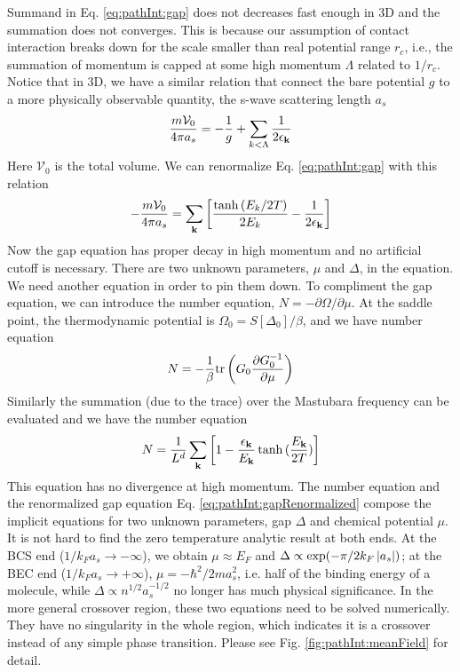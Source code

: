 Summand in Eq. \ref{eq:pathInt:gap} does not decreases fast enough in 3D and the summation does not converges.  This is because our assumption of contact interaction breaks down for the scale smaller than real potential range $r_{c}$, i.e., the summation of momentum is capped at some high momentum $\Lambda$ related to $1/r_{c}$.  Notice that in 3D, we have a similar relation that connect the bare potential $g$ to a more physically observable quantity, the s-wave scattering length $a_{s}$
\begin{equation}\label{eq:pathInt:as}
\frac{m\mathcal{V}_{0}}{4\pi{}a_{s}}=-\frac{1}{g}+\sum_{k<\Lambda}\frac{1}{2\epsilon_{\mathbf{k}}}
\end{equation}
Here $\mathcal{V}_{0}$ is the total volume.  We can renormalize Eq. \ref{eq:pathInt:gap} with this relation
\begin{equation}\label{eq:pathInt:gapRenormalized}
-\frac{m\mathcal{V}_{0}}{4\pi{}a_{s}}=\sum_{\mathbf{k}}\left[\frac{\tanh{(E_k/2T)}}{2E_k}-\frac{1}{2\epsilon_{\mathbf{k}}}\right]
\end{equation}
Now the gap equation has proper decay in high momentum and no artificial cutoff is necessary.  There are two unknown parameters, $\mu$ and $\Delta$,  in the equation.  We need another equation in order to pin them down. To compliment the gap equation, we can introduce the number equation, $N=-\partial\Omega/\partial\mu$. At the saddle point, the thermodynamic potential is $\Omega_{0}=S[\Delta_{0}]/\beta$, and we have number equation
\begin{equation*}
N=-\frac{1}{\beta}\text{tr}\left({G_{0}\frac{\partial{G_{0}^{-1}}}{\partial{\mu}}}\right)
\end{equation*}
Similarly the summation (due to the trace) over the Mastubara frequency can be evaluated and we have the number equation
\begin{equation}
N=\frac{1}{L^{d}}\sum_{\mathbf{k}}\left[1-\frac{\epsilon_{\mathbf{k}}}{E_{\mathbf{k}}}\tanh{(\frac{E_{\ensuremath{\mathbf{k}}}}{2T})}\right]
\end{equation}
This equation has no divergence at high momentum.  The number equation  and the renormalized gap equation Eq. \ref{eq:pathInt:gapRenormalized} compose the implicit equations for two unknown parameters, gap $\Delta$ and chemical potential $\mu$.  It is not hard to find the zero temperature analytic result at both ends.  At the BCS end ($1/k_{F}a_{s}\rightarrow-\infty$), we obtain $\mu\approx{}E_{F}$ and $\Delta\propto\exp(-\pi/2k_{F}\left\lvert{a_{s}}\right\rvert)$; at the BEC end ($1/k_{F}a_{s}\rightarrow+\infty$),  $\mu=-\hbar^{2}/2ma_{s}^{2}$, i.e. half of the binding energy of a molecule, while $\Delta\propto{}n^{1/2}a_{s}^{-1/2}$ no longer has  much physical significance.  In the more general crossover region, these two equations need to be solved numerically.  They have no singularity in the whole region, which indicates it is a crossover instead of any simple phase transition.  Please see Fig. \ref{fig:pathInt:meanField} for detail. 

